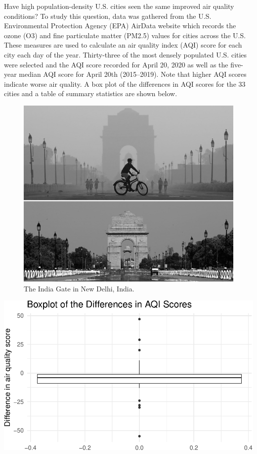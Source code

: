 \documentclass[
]{report}
\begin{document}
Have high population-density U.S. cities seen the same improved air quality conditions? To study this question, data was gathered from the U.S. Environmental Protection Agency (EPA) AirData website which records the ozone (O3) and fine particulate matter (PM2.5) values for cities across the U.S. These measures are used to calculate an air quality index (AQI) score for each city each day of the year. Thirty-three of the most densely populated U.S. cities were selected and the AQI score recorded for April 20, 2020 as well as the five-year median AQI score for April 20th (2015--2019). Note that higher AQI scores indicate worse air quality. A box plot of the differences in AQI scores for the 33 cities and a table of summary statistics are shown below.

\begin{figure}

{\centering \includegraphics[width=0.6\linewidth]{images/air_pollution_greyscale} 

}

\caption{The India Gate in New Delhi, India.}\label{fig:covid}
\end{figure}

\vspace{.05in}

\begin{center}\includegraphics[width=0.6\linewidth]{08-paired_files/figure-latex/unnamed-chunk-2-1} \end{center}
\end{document}
